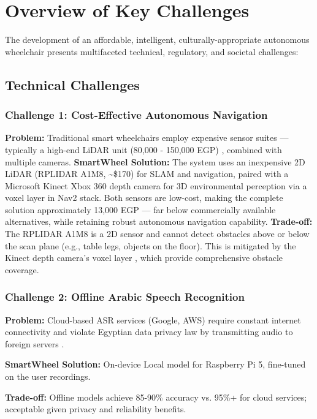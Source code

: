 \documentclass[12pt,a4paper]{report}
\begin{document}
\section{Overview of Key Challenges}

The development of an affordable, intelligent, culturally-appropriate autonomous wheelchair presents multifaceted technical, regulatory, and societal challenges:

\subsection{Technical Challenges}

\subsubsection{Challenge 1: Cost-Effective Autonomous Navigation}
\textbf{Problem:} Traditional smart wheelchairs employ expensive sensor suites --- typically a high-end LiDAR unit (80,000 - 150,000 EGP) \cite{3dlidarprice},  \cite{lidarprice}combined with multiple cameras.
\textbf{SmartWheel Solution:} The system uses an inexpensive 2D LiDAR (RPLIDAR A1M8, \textasciitilde\$170) \cite{rplidar_a1m8}for SLAM and navigation, paired with a Microsoft Kinect Xbox 360 depth camera for 3D environmental perception via a voxel layer in Nav2 stack. Both sensors are low-cost, making the complete solution approximately 13,000 EGP --- far below commercially available alternatives, while retaining robust autonomous navigation capability.
\textbf{Trade-off:} The RPLIDAR A1M8 is a 2D sensor and cannot detect obstacles above or below the scan plane (e.g., table legs, objects on the floor). This is mitigated by the Kinect depth camera's voxel layer , which provide comprehensive obstacle coverage.

\subsubsection{Challenge 2: Offline Arabic Speech Recognition}

\textbf{Problem:} Cloud-based ASR services (Google, AWS) require constant internet connectivity and violate Egyptian data privacy law by transmitting audio to foreign servers \cite{egypt_law_151}.

\textbf{SmartWheel Solution:} On-device Local model for Raspberry Pi 5, fine-tuned on the user recordings.

\textbf{Trade-off:} Offline models achieve 85-90\% accuracy vs. 95\%+ for cloud services; acceptable given privacy and reliability benefits.
\end{document}
